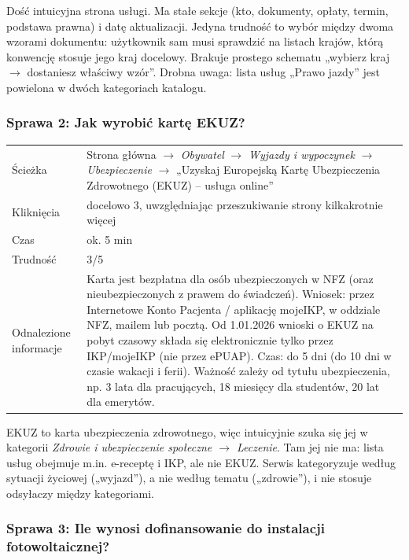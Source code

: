 \documentclass[11pt,a4paper]{article}
\begin{document}
Dość intuicyjna strona usługi. Ma stałe sekcje (kto, dokumenty, opłaty, termin, podstawa prawna) i datę aktualizacji. Jedyna trudność to wybór między dwoma wzorami dokumentu: użytkownik sam musi sprawdzić na listach krajów, którą konwencję stosuje jego kraj docelowy. Brakuje prostego schematu „wybierz kraj $\rightarrow$ dostaniesz właściwy wzór”. Drobna uwaga: lista usług „Prawo jazdy” jest powielona w dwóch kategoriach katalogu.

\subsubsection*{Sprawa 2: Jak wyrobić kartę EKUZ?}

\begin{tabularx}{\textwidth}{@{}L{3.6cm}Y@{}}
\toprule
Ścieżka & Strona główna $\rightarrow$ \textit{Obywatel} $\rightarrow$ \textit{Wyjazdy i wypoczynek} $\rightarrow$ \textit{Ubezpieczenie} $\rightarrow$ „Uzyskaj Europejską Kartę Ubezpieczenia Zdrowotnego (EKUZ) -- usługa online” \\
Kliknięcia & docelowo 3, uwzględniając przeszukiwanie strony kilkakrotnie więcej \\
Czas & ok. 5 min \\
Trudność & 3/5 \\
Odnalezione informacje & Karta jest bezpłatna dla osób ubezpieczonych w NFZ (oraz nieubezpieczonych z prawem do świadczeń). Wniosek: przez Internetowe Konto Pacjenta / aplikację mojeIKP, w oddziale NFZ, mailem lub pocztą. Od 1.01.2026 wnioski o EKUZ na pobyt czasowy składa się elektronicznie tylko przez IKP/mojeIKP (nie przez ePUAP). Czas: do 5 dni (do 10 dni w czasie wakacji i ferii). Ważność zależy od tytułu ubezpieczenia, np. 3 lata dla pracujących, 18 miesięcy dla studentów, 20 lat dla emerytów. \\
\bottomrule
\end{tabularx}

EKUZ to karta ubezpieczenia zdrowotnego, więc intuicyjnie szuka się jej w kategorii \textit{Zdrowie i ubezpieczenie społeczne $\rightarrow$ Leczenie}. Tam jej nie ma: lista usług obejmuje m.in. e-receptę i IKP, ale nie EKUZ. Serwis kategoryzuje według sytuacji życiowej („wyjazd”), a nie według tematu („zdrowie”), i nie stosuje odsyłaczy między kategoriami.

\subsubsection*{Sprawa 3: Ile wynosi dofinansowanie do instalacji fotowoltaicznej?}
\end{document}
